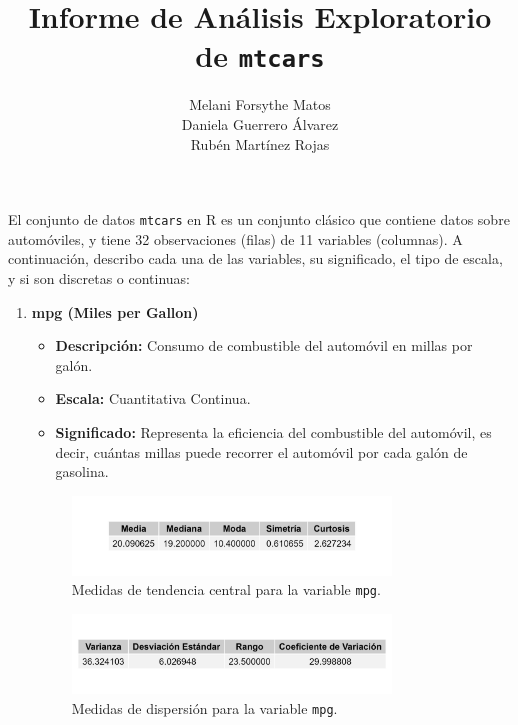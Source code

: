 \documentclass{article}
\title{Informe de Análisis Exploratorio de \texttt{mtcars}}
\author{
      Melani Forsythe Matos \\
      Daniela Guerrero Álvarez \\
      Rubén Martínez Rojas
    }
\date{} %
\begin{document}
\maketitle

\newpage %


El conjunto de datos \texttt{mtcars} en R es un conjunto clásico que contiene datos sobre automóviles, y tiene 32 observaciones (filas) de 11 variables (columnas). A continuación, describo cada una de las variables, su significado, el tipo de escala, y si son discretas o continuas:

\begin{enumerate}
    \item \textbf{mpg (Miles per Gallon)}

          \begin{itemize}
              \item \textbf{Descripción:} Consumo de combustible del automóvil en millas por galón.
              \item \textbf{Escala:} Cuantitativa Continua.
              \item \textbf{Significado:} Representa la eficiencia del combustible del automóvil, es decir, cuántas millas puede recorrer el automóvil por cada galón de gasolina.
          \end{itemize}

          \begin{figure}[H]
              \centering
              \includegraphics[width=0.8\textwidth]{MTC/mpg_central.png}
              \caption{Medidas de tendencia central para la variable \texttt{mpg}.}
              \label{fig:mpg_central}
          \end{figure}

          \begin{figure}[H]
              \centering
              \includegraphics[width=0.8\textwidth]{MTC/mpg_dispersion.png}
              \caption{Medidas de dispersión para la variable \texttt{mpg}.}
              \label{fig:mpg_dispersion}
          \end{figure}


\end{enumerate}
\end{document}
